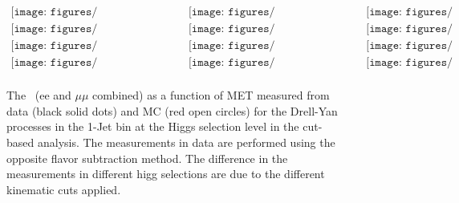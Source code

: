 \begin{figure}[!htbp]
\begin{center}$
\begin{array}{cccc}
\texttt{[image: figures/Routin\_1Jet\_mH115\_818pb\_dy.pdf]} & 
\texttt{[image: figures/Routin\_1Jet\_mH120\_818pb\_dy.pdf]} & 
\texttt{[image: figures/Routin\_1Jet\_mH130\_818pb\_dy.pdf]} \\
\texttt{[image: figures/Routin\_1Jet\_mH140\_818pb\_dy.pdf]} & 
\texttt{[image: figures/Routin\_1Jet\_mH150\_818pb\_dy.pdf]} &
\texttt{[image: figures/Routin\_1Jet\_mH160\_818pb\_dy.pdf]}  \\
\texttt{[image: figures/Routin\_1Jet\_mH170\_818pb\_dy.pdf]} &
\texttt{[image: figures/Routin\_1Jet\_mH180\_818pb\_dy.pdf]} & 
\texttt{[image: figures/Routin\_1Jet\_mH190\_818pb\_dy.pdf]} \\
\texttt{[image: figures/Routin\_1Jet\_mH200\_818pb\_dy.pdf]} &
\texttt{[image: figures/Routin\_1Jet\_mH250\_818pb\_dy.pdf]} &
\texttt{[image: figures/Routin\_1Jet\_mH300\_818pb\_dy.pdf]} \\
\end{array}$
\caption{ The \routin\, (ee and $\mu\mu$ combined) as a function of MET measured from data (black solid dots) 
and MC (red open circles) for the Drell-Yan processes in the 1-Jet bin at the 
Higgs selection level in the cut-based analysis. 
The measurements in data are performed using the opposite flavor subtraction method. 
The difference in the \routin measurements in different higg selections are due to the 
different kinematic cuts applied. 
}
\label{fig:routin_1jet}
\end{center}
\end{figure}
